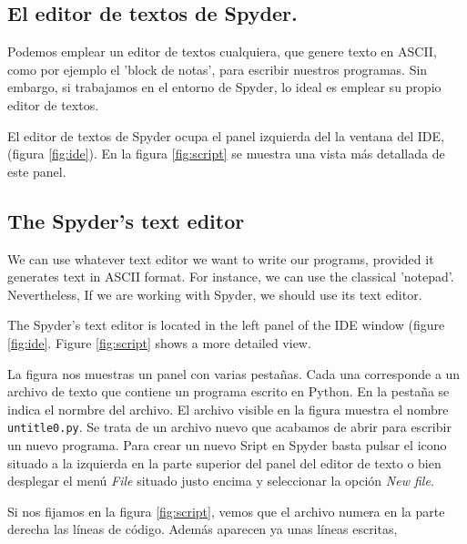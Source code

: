 \begin{paracol}{2}
\subsection{El editor de textos de Spyder.} 
Podemos emplear un editor de textos cualquiera, que genere texto en ASCII, como por ejemplo el 'block de notas', para escribir nuestros programas. Sin embargo, si trabajamos en el entorno de Spyder, lo ideal es emplear su propio editor de textos.

El editor de textos de Spyder ocupa el panel izquierda del la ventana del IDE, (figura \ref{fig:ide}). En la figura \ref{fig:script} se muestra una vista más detallada de este panel.

\switchcolumn

\subsection{The Spyder's text editor}
We can use whatever text editor we want to write our programs, provided it generates text in ASCII format. For instance, we can use the classical 'notepad'. Nevertheless, If we are working with Spyder, we should use its text editor.

The Spyder's text editor is located in the left panel of the IDE window (figure \ref{fig:ide}. Figure \ref{fig:script} shows a more detailed view.

\switchcolumn
La figura nos muestras un panel con varias pestañas. Cada una corresponde a un archivo de texto que contiene un programa escrito en Python. En la pestaña se indica el normbre del archivo. El archivo visible en la figura muestra el nombre \texttt{untitle0.py}. Se trata de un archivo nuevo que acabamos de abrir para escribir un nuevo programa. Para crear un nuevo Sript en Spyder basta pulsar el icono situado a la izquierda en la parte superior del panel del editor de texto o bien desplegar el menú \emph{File} situado justo encima y seleccionar la opción \emph{New file}.

Si nos fijamos en la figura \ref{fig:script}, vemos que el archivo numera en la parte derecha las líneas de código. Además aparecen ya unas líneas escritas,


\end{paracol}
